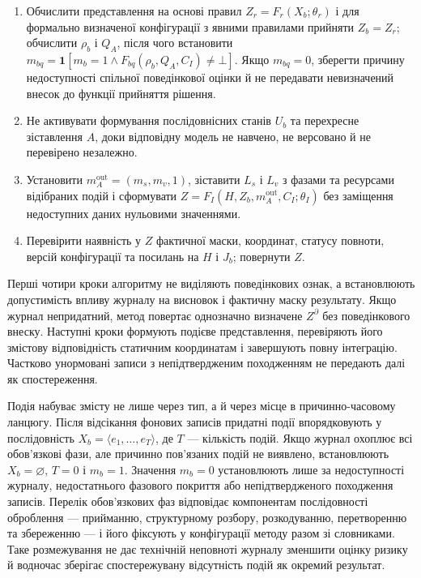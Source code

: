\begin{algorithm}[H]
\begin{enumerate}[label=\arabic*.,leftmargin=6mm,itemsep=0pt,topsep=1pt]
\item Обчислити представлення на основі правил $Z_r=F_r(X_b;\theta_r)$ і для формально визначеної конфігурації з явними правилами прийняти $Z_b=Z_r$; обчислити $\rho_b$ і $Q_A$, після чого встановити $m_{bq}=\mathbf 1\!\left[m_b=1\land F_{bq}(\rho_b,Q_A,C_I)\neq\bot\right]$. Якщо $m_{bq}=0$, зберегти причину недоступності спільної поведінкової оцінки й не передавати невизначений внесок до функції прийняття рішення.
\item Не активувати формування послідовнісних станів $U_b$ та перехресне зіставлення $A$, доки відповідну модель не навчено, не версовано й не перевірено незалежно.
\item Установити $m_A^{\mathrm{out}}=(m_s,m_v,1)$, зіставити $L_s$ і $L_v$ з фазами та ресурсами відібраних подій і сформувати $Z=F_I(H,Z_b,m_A^{\mathrm{out}},C_I;\theta_I)$ без заміщення недоступних даних нульовими значеннями.
\item Перевірити наявність у $Z$ фактичної маски, координат, статусу повноти, версій конфігурації та посилань на $H$ і $J_b$; повернути $Z$.
\end{enumerate}
\endgroup
\end{algorithm}

Перші чотири кроки алгоритму не виділяють поведінкових ознак, а встановлюють допустимість впливу журналу на висновок і фактичну маску результату. Якщо журнал непридатний, метод повертає однозначно визначене $Z^{\partial}$ без поведінкового внеску. Наступні кроки формують подієве представлення, перевіряють його змістову відповідність статичним координатам і завершують повну інтеграцію. Частково унормовані записи з непідтвердженим походженням не передають далі як спостереження.

Подія набуває змісту не лише через тип, а й через місце в причинно-часовому ланцюгу. Після відсікання фонових записів придатні події впорядковують у послідовність $X_b=\langle e_1,\ldots,e_T\rangle$, де $T$ --- кількість подій. Якщо журнал охоплює всі обов’язкові фази, але причинно пов’язаних подій не виявлено, встановлюють $X_b=\varnothing$, $T=0$ і $m_b=1$. Значення $m_b=0$ установлюють лише за недоступності журналу, недостатнього фазового покриття або непідтвердженого походження записів. Перелік обов’язкових фаз відповідає компонентам послідовності оброблення --- прийманню, структурному розбору, розкодуванню, перетворенню та збереженню --- і його фіксують у конфігурації методу разом зі словниками. Таке розмежування не дає технічній неповноті журналу зменшити оцінку ризику й водночас зберігає спостережувану відсутність подій як окремий результат.

